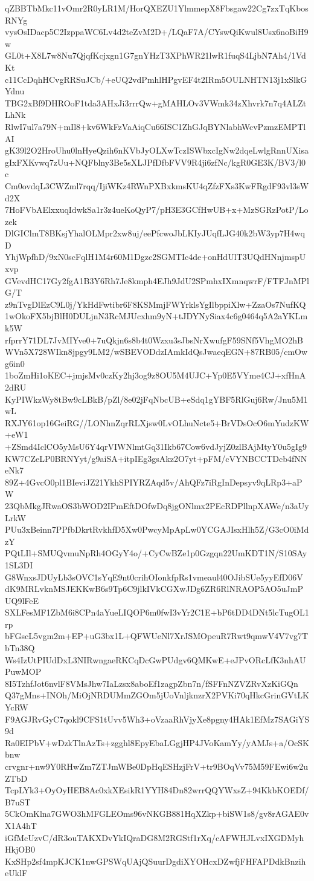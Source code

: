qZBBTbMkc11vOmr2R0yLR1M/HorQXEZU1YlmmepX8Fbsgaw22Cg7zxTqKbosRNYg
vysOsIDacp5C2IzppaWC6Lv4d2teZvM2D+/LQaF7A/CYswQiKwul8Usx6noBiH9w
GL0t+X8L7w8Nu7QjqfKcjxgn1G7gnYHzT3XPhWR21lwR1fuqS4LjbN7Ah4/1VdKt
c11CcDqhHCvgRRSuJCb/+eUQ2vdPmhlHPgvEF4t2IRm5OULNHTN13j1xSlkGYdnu
TBG2xBf9DHROoF1tda3AHxJi3rrrQw+gMAHLOv3VWmk34zXhvrk7n7q4ALZtLhNk
RlwI7ul7a79N+mIl8+kv6WkFzVaAiqCu66ISC1ZhGJqBYNlabhWcvPzmzEMPTlAI
gK39l2O2HroUhu0lnHyeQzih6nKVbJyOLXwTczISWbxcIgNw2dqeLwlgRnnUXisa
gIxFXKvwq7zUu+NQFblny3Be5sXLJPfDfbFVV9R4ji6zfNc/kgR0GE3K/BV3/l0c
Cm0ovdqL3CWZml7rqq/IjiWKz4RWnPXBxkmsKU4qZfzFXs3KwFRgdF93vl3sWd2X
7HoFVbAElxxuqIdwkSa1r3z4ueKoQyP7/pH3E3GCfHwUB+x+MzSGRzPotP/Lozek
DlGIClmT8BKsjYhalOLMpr2xw8uj/eePfcwoJbLKIyJUqfLJG40k2bW3yp7H4wqD
YhjWpfhD/9xN0scFqlH1M4r60M1Dgzc2SGMTIc4de+onHdUlT3UQdHNnjmspUxvp
GVevdHC17Gy2fgA1B3Y6Rh7Je8kmph4EJh9JdU2SPmhxIXmnqwrF/FTFJnMPlG/T
z9nTvgDlEzC9L0j/YkHdFwtibr6F8KSMmjFWYrklsYgIlbppiXlw+ZzaOs7NufKQ
1wOkoFX5bjBlH0DULjnN3RcMJUcxhm9yN+tJDYNySiax4c6g0464q5A2aYKLmk5W
rfprrY71DL7JvMIYve0+7uQkjn6s8b4t0Wzxu3sJbsNrXwufgF59SNf5VhgMO2hB
WVn5X728WIkn8jpgy9LM2/wSBEVODdzIAmkIdQsJwaeqEGN+87RB05/cmOwg6in0
1boZmHi1oKEC+jmjsMv0czKy2hj3og9z8OU5M4UJC+Yp0E5VYme4CJ+xfHnA2dRU
KyPIWkzWy8tBw9cLBkB/pZl/8e02jFqNbcUB+eSdq1gYBF5RlGuj6Rw/Jnu5M1wL
RXJY61op16GeiRG//LONhnZqrRLXjsw0LvOLhuNcte5+BrVDsOcO6mYudzKW+eW1
+ZSmd4IclCO5yMsU6Y4qrVIWNlmtGq31Ikb67Cow6vdJyjZ0zlBAjMtyY0u5gIg9
KW7CZeLP0BRNYyt/g9aiSA+itpIEg3gsAkz2O7yt+pFM/cVYNBCCTDcb4fNNeNk7
89Z+4GvcO0pl1BIeviJZ21YkhSPIYRZAqd5v/AhQFz7iRgInDepsyv9qLRp3+aPW
23QbMkgJRwaOS3bWOD2IPmEftDOfwDq8jgONlmx2PEcRDPllnpXAWe/n3aUyLrkW
PUu3xBeinn7PPfbDkrtRvkhfD5Xw0PwcyMpApLw0YCGAJIsxHlh5Z/G3cO0iMdzY
PQtLIl+SMUQvmuNpRh4OGyY4o/+CyCwBZe1p0Gzgqn22UmKDT1N/S10SAy1SL3DI
G8WnxsJDUyLb3sOVC1sYqE9nt0crihOIonkfpRs1vmeaul40OJibSUe5yyEfD06V
dK9MRLvknMSJEKKwB6s9Tp6C9jlkIVkCGXwJDg6ZR6RlNRAOP5AO5uJmPUQ9lFeE
SXLFesMF1ZbM6i8CPn4aYueLIQOP6m0fwI3vYr2C1E+bP6tDD4DNt5lcTugOL1rp
bFGscL5vgm2m+EP+uG3bx1L+QFWUeNl7XrJSMOpeuR7Rwt9qmwV4V7vg7TbTn38Q
Ws4IzUtPIUdDxL3NIRwngaeRKCqDcGwPUdgv6QMKwE+eJPvORcLfK3nhAUPuwMOP
8I5TzhfJot6nvlF8VMsJhw7IaLzsx8aboEf1zagpZbn7n/fSFFnNZVZRvXzKiGQn
Q37gMns+INOh/MiOjNRDUMmZGOm5jUoVnljknzrX2PVKi70qHkcGrinGVtLKYcRW
F9AGJRvGyC7qokl9CFS1tUvv5Wh3+oVzaaRhVjyXe8pgny4HAk1EfMz7SAGiYS9d
Ra0EIPbV+wDzkTlnAzTs+zgghl8EpyEbaLGgjHP4JVoKamYy/yAMJs+a/OcSKbnw
crvgnr+nw9Y0RHwZm7ZTJmWBe0DpHqESHzjFrV+tr9BOqVv75M59FEwi6w2uZTbD
TcpLYk3+OyOyHEB8Ac0xkXEsikR1YYH84Dn82wrrQQYWxsZ+94KkbKOEDf/B7uST
5CkOmKlna7GWO3hMFGLEOms96vNKGB881HqXZkp+biSW1s8/gv8rAGAE0vX1A4hT
iGfMcUzvC/dR3ouTAKXDvYkIQraDG8M2RGStf1rXq/cAFWHJLvxIXGDMyhHkjOB0
KxSHp2sf4mpKJCK1nwGPSWqUAjQSuurDgdiXYOHcxDZwfjFHFAPDdkBnziheUklF
